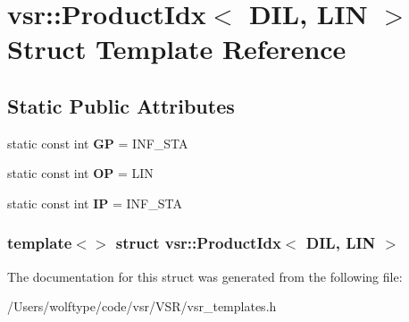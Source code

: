 \hypertarget{structvsr_1_1_product_idx_3_01_d_i_l_00_01_l_i_n_01_4}{\section{vsr\-:\-:Product\-Idx$<$ D\-I\-L, L\-I\-N $>$ Struct Template Reference}
\label{structvsr_1_1_product_idx_3_01_d_i_l_00_01_l_i_n_01_4}
}
\subsection*{Static Public Attributes}
\begin{DoxyCompactItemize}
\item 
\hypertarget{structvsr_1_1_product_idx_3_01_d_i_l_00_01_l_i_n_01_4_a0aafe4f084bf77866f9dbca8156191b2}{static const int {\bfseries G\-P} = I\-N\-F\-\_\-\-S\-T\-A}\label{structvsr_1_1_product_idx_3_01_d_i_l_00_01_l_i_n_01_4_a0aafe4f084bf77866f9dbca8156191b2}

\item 
\hypertarget{structvsr_1_1_product_idx_3_01_d_i_l_00_01_l_i_n_01_4_a009a428f0bc76d9110e149e39c984352}{static const int {\bfseries O\-P} = L\-I\-N}\label{structvsr_1_1_product_idx_3_01_d_i_l_00_01_l_i_n_01_4_a009a428f0bc76d9110e149e39c984352}

\item 
\hypertarget{structvsr_1_1_product_idx_3_01_d_i_l_00_01_l_i_n_01_4_a743d63c15a8229636b108692d3be22e3}{static const int {\bfseries I\-P} = I\-N\-F\-\_\-\-S\-T\-A}\label{structvsr_1_1_product_idx_3_01_d_i_l_00_01_l_i_n_01_4_a743d63c15a8229636b108692d3be22e3}

\end{DoxyCompactItemize}
\subsubsection*{template$<$$>$ struct vsr\-::\-Product\-Idx$<$ D\-I\-L, L\-I\-N $>$}



The documentation for this struct was generated from the following file\-:\begin{DoxyCompactItemize}
\item 
/\-Users/wolftype/code/vsr/\-V\-S\-R/vsr\-\_\-templates.\-h\end{DoxyCompactItemize}
